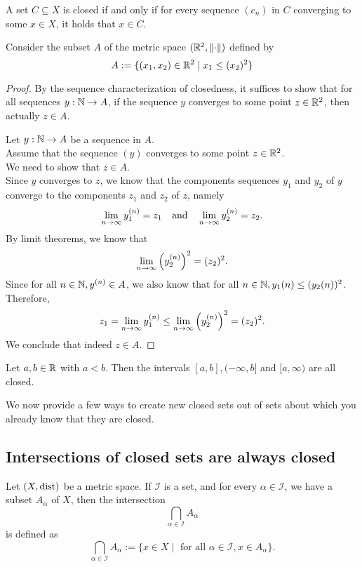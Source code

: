 \begin{proposition}
    A set $C \subseteq X$ is closed if and only if for every sequence $(c_n)$ in $C$ converging to some $x \in X$,
    it holds that $x \in C$.
\end{proposition}
\begin{example}
    Consider the subset $A$ of the metric space $(\mathbb{R}^2, \norm{\cdot})$ defined by
    $$A:=\{(x_1,x_2) \in \mathbb{R}^2 \mid x_1 \le (x_2)^2\}$$
\end{example}
\begin{proof}[Proof]
    By the sequence characterization of closedness, it suffices to show that for all sequences $y: \mathbb{N} \to A$, if the sequence $y$
    converges to some point $z \in \mathbb{R}^2$, then actually $z \in A$.

    \noindent Let $y: \mathbb{N} \to A$ be a sequence in $A$. \\
    Assume that the sequence $(y)$ converges to some point $z \in \mathbb{R}^2$. \\
    We need to show that $z \in A$. \\
    Since $y$ converges to $z$, we know that the components sequences $y_1$ and $y_2$ of $y$ converge to the components $z_1$ and $z_2$ of $z$, namely
    $$\lim_{n\to\infty} y_1^{(n)}=z_1 \quad \text{and} \quad \lim_{n\to\infty} y_2^{(n)}=z_2.$$
    By limit theorems, we know that
    $$\lim_{n\to\infty} \left(y_2^{(n)}\right)^2 = (z_2)^2.$$
    Since for all $n \in \mathbb{N}, y^{(n)}\in A$, we also know that for all $n \in \mathbb{N}, y_1(n) \le (y_2(n))^2$. Therefore,
    $$z_1 = \lim_{n\to\infty} y_1^{(n)} \le \lim_{n\to\infty} \left(y_2^{(n)}\right)^2 = (z_2)^2.$$
    We conclude that indeed $z \in A$.
\end{proof}

\begin{proposition}
    Let $a,b \in \mathbb{R}$ with $a<b$. Then the intervals $[a,b], (-\infty,b]$ and $[a, \infty)$ are all closed.
\end{proposition}

We now provide a few ways to create new closed sets out of sets about which you already know that they are closed.

\subsection*{Intersections of closed sets are always closed}
Let $(X, \text{dist})$ be a metric space. If $\mathcal{I}$ is a set, and for every $\alpha \in \mathcal{I}$, we have a subset
$A_\alpha$ of $X$, then the intersection
$$\bigcap_{\alpha \in \mathcal{I}}A_\alpha$$
is defined as
$$\bigcap_{\alpha \in \mathcal{I}}A_\alpha := \{x \in X \mid \text{ for all } \alpha \in \mathcal{I}, x \in A_\alpha\}.$$

